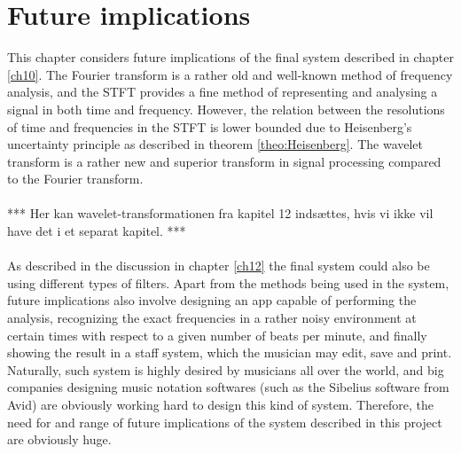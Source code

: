 \chapter{Future implications} \label{ch14}
This chapter considers future implications of the final system described in chapter \ref{ch10}. The Fourier transform is a rather old and well-known method of frequency analysis, and the STFT provides a fine method of representing and analysing a signal in both time and frequency. However, the relation between the resolutions of time and frequencies in the STFT is lower bounded due to Heisenberg's uncertainty principle as described in theorem \ref{theo:Heisenberg}. The wavelet transform is a rather new and superior transform in signal processing compared to the Fourier transform.
\\ \\
*** Her kan wavelet-transformationen fra kapitel 12 indsættes, hvis vi ikke vil have det i et separat kapitel. ***
\\ \\
As described in the discussion in chapter \ref{ch12} the final system could also be using different types of filters. Apart from the methods being used in the system, future implications also involve designing an app capable of performing the analysis, recognizing the exact frequencies in a rather noisy environment at certain times with respect to a given number of beats per minute, and finally showing the result in a staff system, which the musician may edit, save and print. Naturally, such system is highly desired by musicians all over the world, and big companies designing music notation softwares (such as the Sibelius software from Avid) are obviously working hard to design this kind of system. Therefore, the need for and range of future implications of the system described in this project are obviously huge.